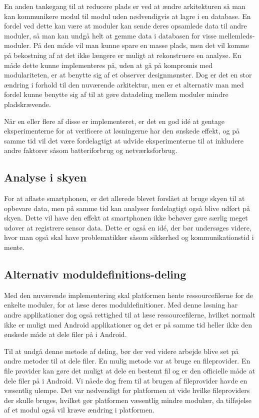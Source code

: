 En anden tankegang til at reducere plads er ved at ændre arkitekturen så man kan kommunikere modul til modul uden nødvendigvis at lagre i en database.
En fordel ved dette kan være at moduler kan sende deres opsamlede data til andre moduler, så man kan undgå helt at gemme data i databasen for visse mellemleds-moduler.
På den måde vil man kunne spare en masse plads, men det vil komme på bekostning af at det ikke længere er muligt at rekonstruere en analyse. En måde dette kunne implementeres på, uden at gå på kompromis med modulariteten, er at benytte sig af et observer designmønster.
Dog er det en stor ændring i forhold til den nuværende arkitektur, men er et alternativ man med fordel kunne benytte sig af til at gøre datadeling mellem moduler mindre pladskrævende.

Når en eller flere af disse er implementeret, er det en god idé at gentage eksperimenterne for at verificere at løsningerne har den ønskede effekt, og på samme tid vil det være fordelagtigt at udvide eksperimenterne til at inkludere andre faktorer såsom batteriforbrug og netværksforbrug.

\subsection{Analyse i skyen}
For at aflaste smartphonen, er det allerede blevet forslået at bruge skyen til at opbevare data, men på samme tid kan analyser fordelagtigt også blive udført på skyen. 
Dette vil have den effekt at smartphonen ikke behøver gøre særlig meget udover at registrere sensor data.
Dette er også en idé, der bør undersøges videre, hvor man også skal have problematikker såsom sikkerhed og kommunikationstid i mente.

\subsection{Alternativ moduldefinitions-deling}
Med den nuværende implementering skal platformen hente ressourcefilerne for de enkelte moduler, for at læse deres moduldefinitioner.
Med denne løsning har andre applikationer dog også rettighed til at læse ressourcefilerne, hvilket normalt ikke er muligt med Android applikationer og det er på samme tid heller ikke den ønskede måde at dele filer på i Android.

Til at undgå denne metode af deling, bør der ved videre arbejde blive set på andre metoder til at dele filer.
En mulig metode var at bruge en fileprovider.
En file provider kan gøre det muligt at dele en bestemt fil og er den officielle måde at dele filer på i Android.
Vi nåede dog frem til at brugen af fileprovider havde en væsentlig ulempe.
Det var nødvendigt for platformen at vide hvilke fileproviders der skulle bruges, hvilket gør platformen væsentlig mindre modulær, da tilføjelse af et modul også vil kræve ændring i platformen.

